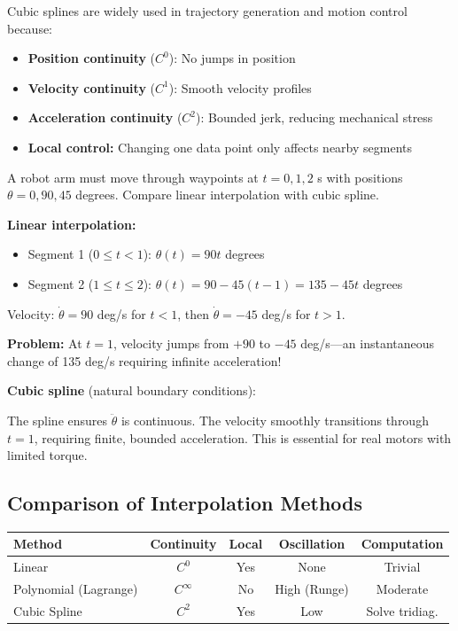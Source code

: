 \begin{keyconceptbox}[title=Why Splines are Preferred for Control]
Cubic splines are widely used in trajectory generation and motion control because:
\begin{itemize}
    \item \textbf{Position continuity} ($C^0$): No jumps in position
    \item \textbf{Velocity continuity} ($C^1$): Smooth velocity profiles
    \item \textbf{Acceleration continuity} ($C^2$): Bounded jerk, reducing mechanical stress
    \item \textbf{Local control:} Changing one data point only affects nearby segments
\end{itemize}
\end{keyconceptbox}

\begin{examplebox}[title=Example 11.12: Spline vs. Linear Interpolation for Trajectory]
A robot arm must move through waypoints at $t = 0, 1, 2$ s with positions $\theta = 0, 90, 45$ degrees. Compare linear interpolation with cubic spline.

\textbf{Linear interpolation:}
\begin{itemize}
    \item Segment 1 ($0 \leq t < 1$): $\theta(t) = 90t$ degrees
    \item Segment 2 ($1 \leq t \leq 2$): $\theta(t) = 90 - 45(t-1) = 135 - 45t$ degrees
\end{itemize}

Velocity: $\dot{\theta} = 90$ deg/s for $t < 1$, then $\dot{\theta} = -45$ deg/s for $t > 1$.

\textbf{Problem:} At $t = 1$, velocity jumps from $+90$ to $-45$ deg/s---an instantaneous change of 135 deg/s requiring infinite acceleration!

\textbf{Cubic spline} (natural boundary conditions):

The spline ensures $\ddot{\theta}$ is continuous. The velocity smoothly transitions through $t = 1$, requiring finite, bounded acceleration. This is essential for real motors with limited torque.
\end{examplebox}

\subsection{Comparison of Interpolation Methods}

\begin{center}
\begin{tabular}{lcccc}
\toprule
\textbf{Method} & \textbf{Continuity} & \textbf{Local} & \textbf{Oscillation} & \textbf{Computation} \\
\midrule
Linear & $C^0$ & Yes & None & Trivial \\
Polynomial (Lagrange) & $C^\infty$ & No & High (Runge) & Moderate \\
Cubic Spline & $C^2$ & Yes & Low & Solve tridiag. \\
\bottomrule
\end{tabular}
\end{center}

